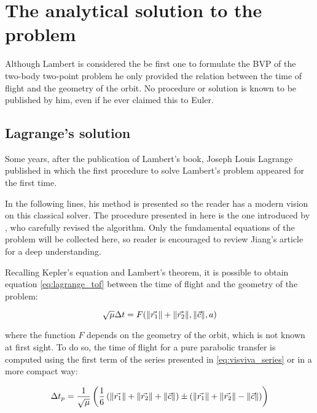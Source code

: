 \section{The analytical solution to the problem}

Although Lambert is considered the be first one to formulate the BVP of the
two-body two-point problem he only provided the relation between the time of
flight and the geometry of the orbit. No procedure or solution is known to be
published by him, even if he ever claimed this to Euler.


\subsection{Lagrange's solution}
\label{sec:lagrange_sol}

Some years, after the publication of Lambert's book, Joseph Louis Lagrange
published  in which the first procedure to solve
Lambert's problem appeared for the first time.

In the following lines, his method is presented so the reader has a modern
vision on this classical solver. The procedure presented in here is the one
introduced by \cite{jiang2016}, who carefully revised the algorithm. Only the
fundamental equations of the problem will be collected here, so reader is
encouraged to review Jiang's article for a deep understanding.

Recalling Kepler's equation and Lambert's theorem, it is possible to obtain
equation \ref{eq:lagrange_tof} between the time of flight and the geometry of
the problem:

\begin{equation}
  \sqrt{\mu} \Delta t = F(\lVert\vec{r_1}\rVert + \lVert\vec{r_2}\rVert, \lVert\vec{c}\rVert, a)
  \label{eq:lagrange_tof}
\end{equation}

where the function $F$ depends on the geometry of the orbit, which is not known
at first sight. To do so, the time of flight for a pure parabolic transfer is
computed using the first term of the series presented in \ref{eq:visviva_series}
or in a more compact way:

\begin{equation}
  \Delta t_p = \frac{1}{\sqrt{\mu}} \left(
  \frac{1}{6}\left(\lVert\vec{r_1}\rVert + \lVert\vec{r_2}\rVert + \lVert\vec{c}\rVert
    \right)  \pm \left(\lVert\vec{r_1}\rVert + \lVert\vec{r_2}\rVert - \lVert\vec{c}\rVert \right) \right)
\end{equation}

